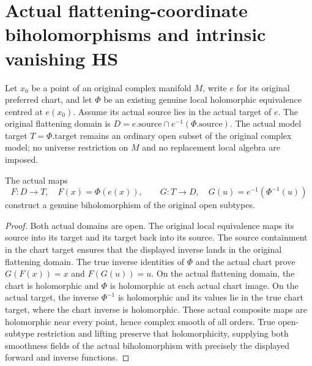 \section{Actual flattening-coordinate biholomorphisms and intrinsic vanishing HS}

Let $x_0$ be a point of an original complex manifold $M$, write $e$ for
its original preferred chart, and let $\Phi$ be an existing genuine
local holomorphic equivalence centred at $e(x_0)$. Assume its actual
source lies in the actual target of $e$. The original flattening domain
is $D=e.\mathrm{source}\cap e^{-1}(\Phi.\mathrm{source})$.
The actual model target $T=\Phi.\mathrm{target}$ remains an ordinary
open subset of the original complex model; no universe restriction on
$M$ and no replacement local algebra are imposed.

\begin{definition}
\label{hir:actual-flat-coordinate-open-biholomorphism}
\leanok
The actual maps
\[
 F:D\longrightarrow T,\quad F(x)=\Phi(e(x)),\qquad
 G:T\longrightarrow D,\quad G(u)=e^{-1}(\Phi^{-1}(u))
\]
construct a genuine biholomorphism of the original open subtypes.
\end{definition}
\begin{proof}
Both actual domains are open. The original local equivalence maps its
source into its target and its target back into its source. The source
containment in the chart target ensures that the displayed inverse
lands in the original flattening domain. The true inverse identities of
$\Phi$ and the actual chart prove $G(F(x))=x$ and $F(G(u))=u$.
On the actual flattening domain, the chart is holomorphic and $\Phi$
is holomorphic at each actual chart image. On the actual target, the
inverse $\Phi^{-1}$ is holomorphic and its values lie in the true chart
target, where the chart inverse is holomorphic. These actual composite
maps are holomorphic near every point, hence complex smooth of all
orders. True open-subtype restriction and lifting preserve that
holomorphicity, supplying both smoothness fields of the actual
biholomorphism with precisely the displayed forward and inverse functions.
\end{proof}

